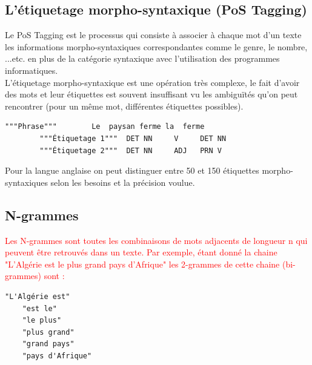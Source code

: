    \subsection{L'étiquetage morpho-syntaxique (PoS Tagging)}
    Le PoS Tagging est le processus qui consiste à associer à chaque mot d'un texte les informations morpho-syntaxiques correspondantes comme le genre, le nombre, ...etc. en plus de la catégorie syntaxique avec l'utilisation des programmes informatiques.\\
    L'étiquetage morpho-syntaxique est une opération très complexe, le fait d'avoir des mots et leur étiquettes est souvent insuffisant vu les ambiguïtés qu'on peut rencontrer (pour un même mot, différentes étiquettes possibles).
    \begin{lstlisting}[style=code]
        """Phrase"""        Le  paysan ferme la  ferme
        """Étiquetage 1"""  DET NN     V     DET NN
        """Étiquetage 2"""  DET NN     ADJ   PRN V
    \end{lstlisting}
    Pour la langue anglaise on peut distinguer entre 50 et 150 étiquettes morpho-syntaxiques selon les besoins et la précision voulue.
    
   
    \subsection{N-grammes}
     \textcolor{red}{Les N-grammes sont toutes les combinaisons de mots adjacents de longueur n qui peuvent être retrouvés dans un texte. Par exemple, étant donné la chaine "L'Algérie est le plus grand pays d'Afrique" les 2-grammes de cette chaine (bi-grammes) sont :}
    
    \begin{lstlisting}[style=code]
    "L'Algérie est"  
    "est le" 
    "le plus"
    "plus grand"
    "grand pays"
    "pays d'Afrique"
    \end{lstlisting}
    
